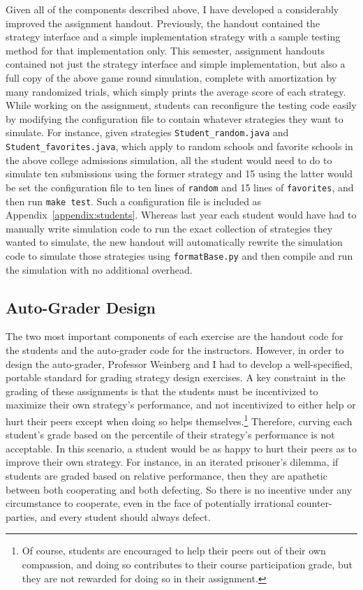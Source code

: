 \documentclass[pageno]{jpaper}
\begin{document}
Given all of the components described above, I have developed a considerably improved the assignment handout.
Previously, the handout contained the strategy interface and a simple implementation strategy with a sample testing method for that implementation only.
This semester, assignment handouts contained not just the strategy interface and simple implementation, but also a full copy of the above game round simulation, complete with amortization by many randomized trials, which simply prints the average score of each strategy.
While working on the assignment, students can reconfigure the testing code easily by modifying the configuration file to contain whatever strategies they want to simulate.
For instance, given strategies \texttt{Student\_random.java} and \texttt{Student\_favorites.java}, which apply to random schools and favorite schools in the above college admissions simulation, all the student would need to do to simulate ten submissions using the former strategy and 15 using the latter would be set the configuration file to ten lines of \texttt{random} and 15 lines of \texttt{favorites}, and then run \texttt{make test}.
Such a configuration file is included as Appendix~\ref{appendix:students}.
Whereas last year each student would have had to manually write simulation code to run the exact collection of strategies they wanted to simulate, the new handout will automatically rewrite the simulation code to simulate those strategies using \texttt{formatBase.py} and then compile and run the simulation with no additional overhead.

\subsection*{Auto-Grader Design}
The two most important components of each exercise are the handout code for the students and the auto-grader code for the instructors.
However, in order to design the auto-grader, Professor Weinberg and I had to develop a well-specified, portable standard for grading strategy design exercises.
A key constraint in the grading of these assignments is that the students must be incentivized to maximize their own strategy's performance, and not incentivized to either help or hurt their peers except when doing so helps themselves.\footnote{Of course, students are encouraged to help their peers out of their own compassion, and doing so contributes to their course participation grade, but they are not rewarded for doing so in their assignment.}
Therefore, curving each student's grade based on the percentile of their strategy's performance is not acceptable.
In this scenario, a student would be as happy to hurt their peers as to improve their own strategy.
For instance, in an iterated prisoner's dilemma, if students are graded based on relative performance, then they are apathetic between both cooperating and both defecting.
So there is no incentive under any circumstance to cooperate, even in the face of potentially irrational counter-parties, and every student should always defect.
\end{document}

